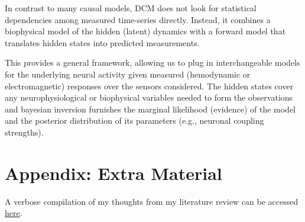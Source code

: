 \documentclass[usletter,12pt]{article} %
\begin{document}
\noindent 
In contrast to many causal models, DCM does not look for statistical dependencies among measured time-series directly. Instead, it combines a biophysical model of the hidden (latent) dynamics with a forward model that translates hidden states into predicted measurements.  

\noindent 
This provides a general framework, allowing us to plug in interchangeable models for the underlying neural activity given measured (hemodynamic or electromagnetic) responses over the sensors considered.  The hidden states cover any neurophysiological or biophysical variables needed to form the observations and bayesian inversion furnishes the marginal likelihood (evidence) of the model and the posterior distribution of its parameters (e.g., neuronal coupling strengths). 

\newpage


\section{Appendix: Extra Material}\label{extra-material}

\noindent 
A verbose compilation of my thoughts from my literature review can be accessed \href{https://docs.google.com/presentation/d/1RW2VhdHcTehgb-biTPHkPg3PplrurAugfN0Y48rieqc/edit?usp=sharing}{here}.


%
 

\end{document}
